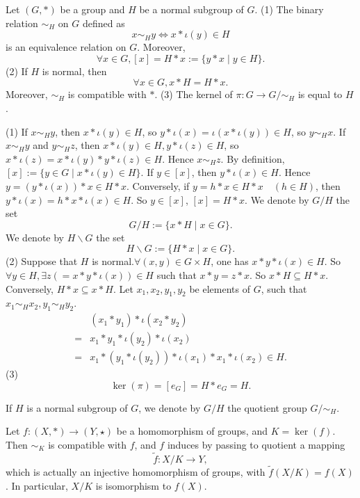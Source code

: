 \begin{propositionenv}
    Let $(G, *)$ be a group and $H$ be a normal subgroup of $G$.
    \newline
    (1) The binary relation $\sim_H$ on $G$ defined as 
    $$x\sim_H y\Leftrightarrow x*\iota(y)\in H$$
    is an equivalence relation on $G$. Moreover,  
    $$\forall x\in G,  [x]=H*x:=\{y*x\mid y\in H\}.$$
    (2) If $H$ is normal,  then
    $$\forall x\in G, x*H=H*x.$$
    Moreover,  $\sim_H$ is compatible with $*$.
    \newline
    (3) The kernel of $\pi :G\rightarrow G/\sim_H$ is equal to $H$.
\end{propositionenv}
\begin{proofenv}
    \quad\newline
    (1) If $x\sim_H y$,  then $x*\iota(y)\in H$,  so $y*\iota(x)=\iota(x*\iota(y))\in H$,  so $y\sim_H x$. If $x\sim_H y$ and $y\sim_H z$,  then $x*\iota(y)\in H,  y*\iota(z)\in H$,  so $x*\iota(z)=x*\iota(y)*y*\iota(z)\in H$. Hence $x\sim_H z$. By definition,  $[x]:=\{y\in G\mid  x*\iota(y)\in H\}$. If $y\in [x]$,  then $y*\iota(x)\in H$. Hence $y=(y*\iota(x))*x\in H*x$. Conversely,  if $y=h*x\in H*x \quad (h\in H)$,  then $y*\iota(x)=h*x*\iota(x)\in H$. So $y\in [x]$,  $[x]=H*x$.
    \newline
    We denote by $G/H $ the set 
    $$G/H:=\{x*H\mid x\in G\}.$$ 
    We denote by $H\backslash G$ the set 
    $$H\backslash G:=\{H*x\mid x\in G\}.$$
    (2) Suppose that $H$ is normal.$\forall (x, y)\in G\times H$,  one has $x*y*\iota(x)\in H$. So $\forall y\in H, \exists z(=x*y*\iota(x))\in H$ such that $x*y=z*x$. So $x*H\subseteq H*x$. Conversely,  $H*x\subseteq x*H$. Let $x_1, x_2, y_1, y_2$ be elements of $G$,  such that $x_1\sim_H x_2, y_1\sim_H y_2$.
    \begin{align*}
&(x_1*y_1)*\iota (x_2*y_2)\\
=&x_1*y_1*\iota (y_2)*\iota (x_2)\\
=&x_1*(y_1*\iota (y_2))*\iota (x_1)*x_1*\iota (x_2)\in H.
\end{align*}
    (3)$$\ker(\pi)=[e_G]=H*e_G=H.$$
\end{proofenv}
\begin{notationenv}
    If $H$ is a normal subgroup of $G$,  we denote by $G/H$ the quotient group $G/\sim_H$.
\end{notationenv}
\begin{theoremenv}
    Let $f:(X, *)\rightarrow (Y, \star)$ be a homomorphism of groups,  and $K=\ker(f)$. Then $\sim_K$ is compatible with $f$,  and $f$ induces by passing to quotient a mapping
    $$\tilde{f}:X/K\longrightarrow Y, $$
    which is actually an injective homomorphism of groups,  with $\tilde{f}(X/K)=f(X)$. In particular,  $X/K$ is isomorphism to $f(X)$.
        \begin{center}
\end{center}
\end{theoremenv}
